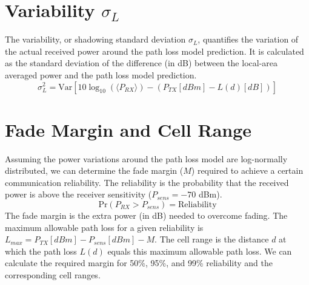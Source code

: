\section{Variability $\sigma_L$}
The variability, or shadowing standard deviation $\sigma_L$, quantifies the variation of the actual received power around the path loss model prediction. It is calculated as the standard deviation of the difference (in dB) between the local-area averaged power and the path loss model prediction.
\begin{equation}
	\sigma_L^2 = \text{Var} \left[ 10\log_{10}(\langle P_{RX} \rangle) - (P_{TX}[dBm] - L(d)[dB]) \right]
\end{equation}

\section{Fade Margin and Cell Range}
Assuming the power variations around the path loss model are log-normally distributed, we can determine the fade margin ($M$) required to achieve a certain communication reliability. The reliability is the probability that the received power is above the receiver sensitivity ($P_{sens} = -70$ dBm).
\begin{equation}
	\text{Pr}(P_{RX} > P_{sens}) = \text{Reliability}
\end{equation}
The fade margin is the extra power (in dB) needed to overcome fading. The maximum allowable path loss for a given reliability is $L_{max} = P_{TX}[dBm] - P_{sens}[dBm] - M$. The cell range is the distance $d$ at which the path loss $L(d)$ equals this maximum allowable path loss. We can calculate the required margin for 50\%, 95\%, and 99\% reliability and the corresponding cell ranges.

